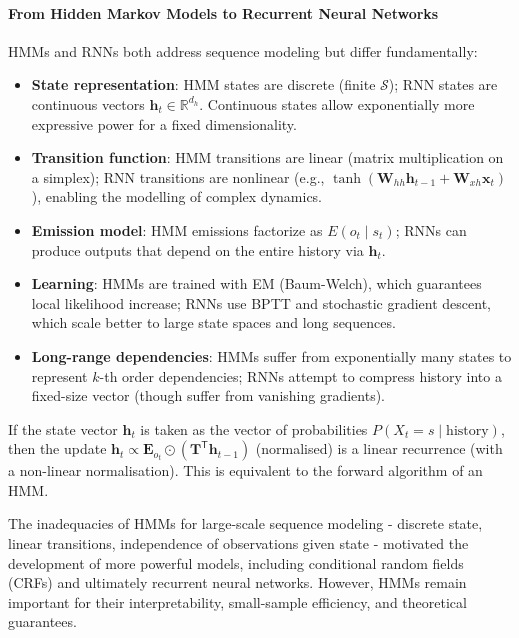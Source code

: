 \documentclass{tufte-handout}
\begin{document}
\paragraph{From Hidden Markov Models to Recurrent Neural Networks}
HMMs and RNNs both address sequence modeling but differ fundamentally:
\begin{itemize}
    \item \textbf{State representation}: HMM states are discrete (finite $\mathcal{S}$); RNN states are continuous vectors $\mathbf{h}_t \in \mathbb{R}^{d_h}$. Continuous states allow exponentially more expressive power for a fixed dimensionality.
    \item \textbf{Transition function}: HMM transitions are linear (matrix multiplication on a simplex); RNN transitions are nonlinear (e.g., $\tanh(\mathbf{W}_{hh}\mathbf{h}_{t-1} + \mathbf{W}_{xh}\mathbf{x}_t)$), enabling the modelling of complex dynamics.
    \item \textbf{Emission model}: HMM emissions factorize as $E(o_t \mid s_t)$; RNNs can produce outputs that depend on the entire history via $\mathbf{h}_t$.
    \item \textbf{Learning}: HMMs are trained with EM (Baum-Welch), which guarantees local likelihood increase; RNNs use BPTT and stochastic gradient descent, which scale better to large state spaces and long sequences.
    \item \textbf{Long-range dependencies}: HMMs suffer from exponentially many states to represent $k$-th order dependencies; RNNs attempt to compress history into a fixed-size vector (though suffer from vanishing gradients).
\end{itemize}

\begin{thm}
    If the state vector $\mathbf{h}_t$ is taken as the vector of probabilities $P(X_t=s \mid \text{history})$, then the update $\mathbf{h}_t \propto \mathbf{E}_{o_t} \odot (\mathbf{T}^{\mathsf{T}} \mathbf{h}_{t-1})$ (normalised) is a linear recurrence (with a non-linear normalisation). This is equivalent to the forward algorithm of an HMM.
\end{thm}

The inadequacies of HMMs for large-scale sequence modeling - discrete state, linear transitions, independence of observations given state - motivated the development of more powerful models, including conditional random fields (CRFs) and ultimately recurrent neural networks. However, HMMs remain important for their interpretability, small-sample efficiency, and theoretical guarantees.
\end{document}

